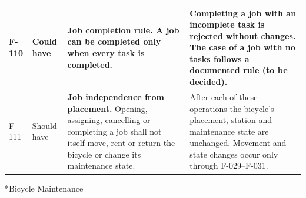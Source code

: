 \documentclass[10pt,a4paper,landscape]{article}
\makeatletter
\renewcommand\subsection{\@startsection{subsection}{2}{0pt}{9pt}{5pt}{\normalfont\large\bfseries}}
\makeatother
\begin{document}
\begin{longtable}{|C{27mm}|C{25mm}|L{79mm}|L{111mm}|}
F-110 & Could have & \textbf{Job completion rule.} A job can be completed only when every task is completed. & Completing a job with an incomplete task is rejected without changes. The case of a job with no tasks follows a documented rule (to be decided). \\ \hline
F-111 & Should have & \textbf{Job independence from placement.} Opening, assigning, cancelling or completing a job shall not itself move, rent or return the bicycle or change its maintenance state. & After each of these operations the bicycle's placement, station and maintenance state are unchanged. Movement and state changes occur only through F-029--F-031. \\ \hline
\end{longtable}

\subsection*{Bicycle Maintenance}
\begingroup
\small
\end{document}
